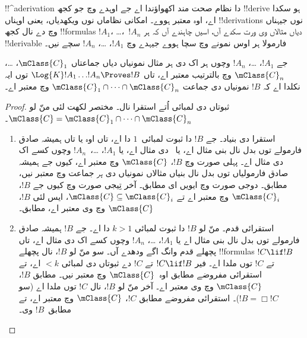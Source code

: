 \documentclass[../../../include/open-logic-section]{subfiles}
\begin{document}


!!^a{derivation} دا نظام صحت مند اکھواؤندا اے جے اوہدے وچ جو کجھ !!{derive} ہو سکدا اے، اوہ معتبر ہووے۔ امکانی نظاماں نوں ویکھدیاں، یعنی اوہناں !!{derivation}s نوں جیہناں وچ  دے نال کجھ !!{formula}s $!A_1$، \dots،~$!A_n$ دیاں مثالاں وی ورت سکدے آں، اسیں چاہندے آں کہ ہر !!{derivable} فارمولا ہر اوس نمونے وچ سچا ہووے جیہدے وچ $!A_1$، \dots، $!A_n$ سچے نیں۔

\begin{thm}
  جے $!A_1$، \dots، $!A_n$ وچوں ہر اک دی ہر مثال نمونیاں دیاں جماعتاں $\mClass{C}_1$، \dots، $\mClass{C}_n$ وچ بالترتیب معتبر اے، تاں $\Log{K}!A_1\dots !A_n
  \Proves !B$ توں ایہ نکلدا اے کہ $!B$ نمونیاں دی جماعت $\mClass{C}_1 \cap \dots \cap \mClass{C}_n$ وچ معتبر اے۔
\end{thm}

\begin{proof}
  ثبوتاں دی لمبائی اُتے استقرا نال۔ مختصر لکھت لئی منّ لو $\mClass{C} =
  \mClass{C}_1 \cap \dots \cap \mClass{C}_n$۔
  \begin{enumerate}
  \item استقرا دی بنیاد۔ جے $!B$ دا ثبوت لمبائی~$1$ دا اے، تاں اوہ یا تاں ہمیشہ صادق فارمولے توں بدل نال بنی مثال اے، یا~ دی مثال اے، یا $!A_1$، \dots،~$!A_n$ وچوں کسے اک دی مثال اے۔ پہلی صورت وچ $!B$، $\mClass{C}$ وچ معتبر اے، کیوں جے ہمیشہ صادق فارمولیاں توں بدل نال بنیاں مثالاں نمونیاں دی \emph{ہر} جماعت وچ معتبر نیں،  مطابق۔ دوجی صورت وچ ایویں ای
     مطابق۔ آخر تِیجی صورت وچ کیوں جے $!B$، $\mClass{C}_i$ وچ معتبر اے تے $\mClass{C} \subseteq
    \mClass{C}_i$، ایس لئی $!B$، $\mClass{C}$ وچ وی معتبر اے،
     مطابق۔
  \item استقرائی قدم۔ منّ لو $!B$ دا ثبوت لمبائی $k>1$ دا اے۔ جے
    $!B$ ہمیشہ صادق فارمولے توں بدل نال بنی مثال اے یا $!A_1$،
    \dots، $!A_n$ وچوں کسے اک دی مثال اے، تاں پچھلے قدم وانگ اگے ودھدے آں۔ سو منّ لو $!B$،
    \MP{} نال پچھلے !!{formula}s $!C \lif !B$ تے
    $!C$ توں ملدا اے۔ فیر $!C \lif !B$ تے $!C$ دے ثبوتاں دی لمبائی $<k$ اے، تے استقرائی مفروضے مطابق اوہ~$\mClass{C}$ وچ معتبر نیں۔
     مطابق $!B$، $\mClass{C}$ وچ وی معتبر اے۔ آخر منّ لو $!B$،
    \Nec{} نال $!C$ توں ملدا اے (سو
    $!B = \Box!C$)۔ استقرائی مفروضے مطابق $!C$،
    $\mClass{C}$ وچ معتبر اے، تے  مطابق~$!B$ وی۔
  \end{enumerate}
\end{proof}
\end{document}
